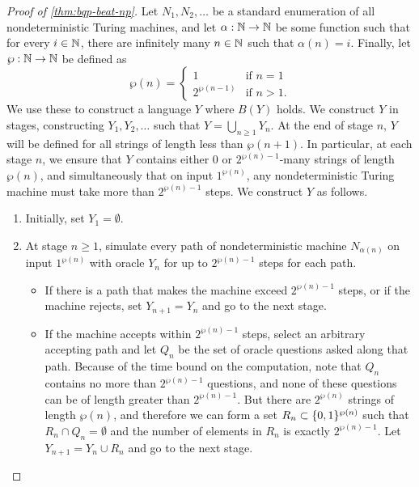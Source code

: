 \documentclass[12pt]{article}
\begin{document}
\begin{mdframed}
\begin{proof}[Proof of \cref{thm:bqp-beat-np}]
  Let $N_1, N_2, \dots$ be a standard enumeration of all nondeterministic Turing
  machines, and let $\alpha : \mathbb{N} \to \mathbb{N}$ be some function such that for every
  $i \in \mathbb{N}$, there are infinitely many $n \in \mathbb{N}$ such that $\alpha(n) = i$.
  Finally, let $\wp : \mathbb{N} \to \mathbb{N}$ be defined as
  $$
    \wp(n) = \begin{cases}
              1            & \text{if $n=1$} \\
              2^{\wp(n-1)} & \text{if $n>1$}.
             \end{cases}
  $$
  We use these to construct a language $Y$ where $B(Y)$ holds. We construct $Y$
  in stages, constructing $Y_1, Y_2, \dots$ such that $Y = \bigcup_{n\ge 1}
  Y_n$. At the end of stage $n$, $Y$ will be defined for all strings of length
  less than $\wp(n+1)$. In particular, at each stage $n$, we ensure that $Y$
  contains either 0 or $2^{\wp(n)-1}$-many strings of length $\wp(n)$, and
  simultaneously that on input $1^{\wp(n)}$, any nondeterministic Turing machine
  must take more than $2^{\wp(n)-1}$ steps. We construct $Y$ as follows.
  \begin{enumerate}
    \item Initially, set $Y_1=\emptyset$.
    \item At stage $n \ge 1$, simulate every path of nondeterministic machine
      $N_{\alpha(n)}$ on input $1^{\wp(n)}$ with oracle $Y_n$ for up to
      $2^{\wp(n)-1}$ steps for each path.
      \begin{itemize}
        \item If there is a path that makes the machine exceed $2^{\wp(n)-1}$
          steps, or if the machine rejects, set $Y_{n+1}=Y_n$ and go to the next
          stage.
        \item If the machine accepts within $2^{\wp(n)-1}$ steps, select an
          arbitrary accepting path and let $Q_n$ be the set of oracle questions
          asked along that path. Because of the time bound on the computation,
          note that $Q_n$ contains no more than $2^{\wp(n)-1}$ questions, and
          none of these questions can be of length greater than $2^{\wp(n)-1}$.
          But there are $2^{\wp(n)}$ strings of length $\wp(n)$, and therefore
          we can form a set $R_n \subset \{0,1\}^{\wp(n)}$ such that $R_n \cap
          Q_n = \emptyset$ and the number of elements in $R_n$ is exactly
          $2^{\wp(n)-1}$. Let $Y_{n+1} = Y_n \cup R_n$ and go to the next stage.

\end{itemize}
\end{enumerate}
\end{proof}
\end{mdframed}
\end{document}
